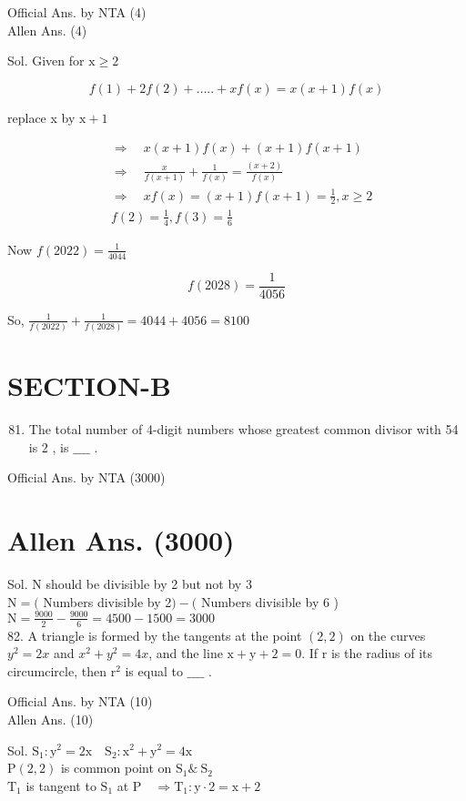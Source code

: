 \documentclass[10pt]{article}
\begin{document}
Official Ans. by NTA (4)\\
Allen Ans. (4)

Sol. Given for \(\mathrm{x} \geq 2\)

\[
f(1)+2 f(2)+\ldots . .+x f(x)=x(x+1) f(x)
\]

replace x by \(\mathrm{x}+1\)

\[
\begin{aligned}
& \Rightarrow \quad x(x+1) f(x)+(x+1) f(x+1) \\
& \Rightarrow \quad \frac{x}{f(x+1)}+\frac{1}{f(x)}=\frac{(x+2)}{f(x)} \\
& \Rightarrow \quad x f(x)=(x+1) f(x+1)=\frac{1}{2}, x \geq 2 \\
& f(2)=\frac{1}{4}, f(3)=\frac{1}{6}
\end{aligned}
\]

Now \(f(2022)=\frac{1}{4044}\)

\[
f(2028)=\frac{1}{4056}
\]

So, \(\frac{1}{f(2022)}+\frac{1}{f(2028)}=4044+4056=8100\)

\section*{SECTION-B}
\begin{enumerate}
  \setcounter{enumi}{80}
  \item The total number of 4-digit numbers whose greatest common divisor with 54 is 2 , is \(\_\_\_\_\) .
\end{enumerate}

Official Ans. by NTA (3000)

\section*{Allen Ans. (3000)}
Sol. N should be divisible by 2 but not by 3\\
\(\mathrm{N}=(\) Numbers divisible by 2\()-(\) Numbers divisible by 6 )\\
\(\mathrm{N}=\frac{9000}{2}-\frac{9000}{6}=4500-1500=3000\)\\
82. A triangle is formed by the tangents at the point \((2,2)\) on the curves \(y^{2}=2 x\) and \(x^{2}+y^{2}=4 x\), and the line \(\mathrm{x}+\mathrm{y}+2=0\). If r is the radius of its circumcircle, then \(\mathrm{r}^{2}\) is equal to \(\_\_\_\_\) .

Official Ans. by NTA (10)\\
Allen Ans. (10)

Sol. \(\mathrm{S}_{1}: \mathrm{y}^{2}=2 \mathrm{x} \quad \mathrm{S}_{2}: \mathrm{x}^{2}+\mathrm{y}^{2}=4 \mathrm{x}\)\\
\(\mathrm{P}(2,2)\) is common point on \(\mathrm{S}_{1} \& \mathrm{~S}_{2}\)\\
\(\mathrm{T}_{1}\) is tangent to \(\mathrm{S}_{1}\) at \(\mathrm{P} \quad \Rightarrow \mathrm{T}_{1}: \mathrm{y} \cdot 2=\mathrm{x}+2\)
\end{document}

